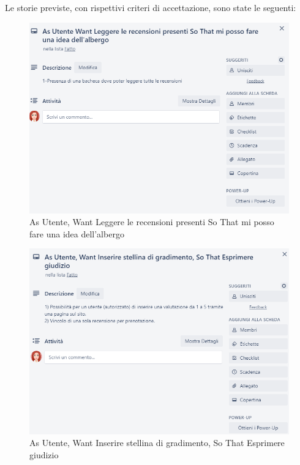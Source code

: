 \documentclass{article}[12pt]
\begin{document}
{{Le storie previste, con rispettivi criteri di accettazione, sono state le seguenti:\\

	\begin{figure}
		\includegraphics[width=\columnwidth]{img/storia5.png}
		\caption{As Utente, Want Leggere le recensioni presenti So That mi posso fare una idea dell'albergo}
	\end{figure}
	\begin{figure}
		\includegraphics[width=\columnwidth]{img/storia1.png}
		\caption{As Utente, Want Inserire stellina di gradimento, So That Esprimere giudizio}
	\end{figure}
	\begin{figure}

\end{figure}}}
\end{document}
